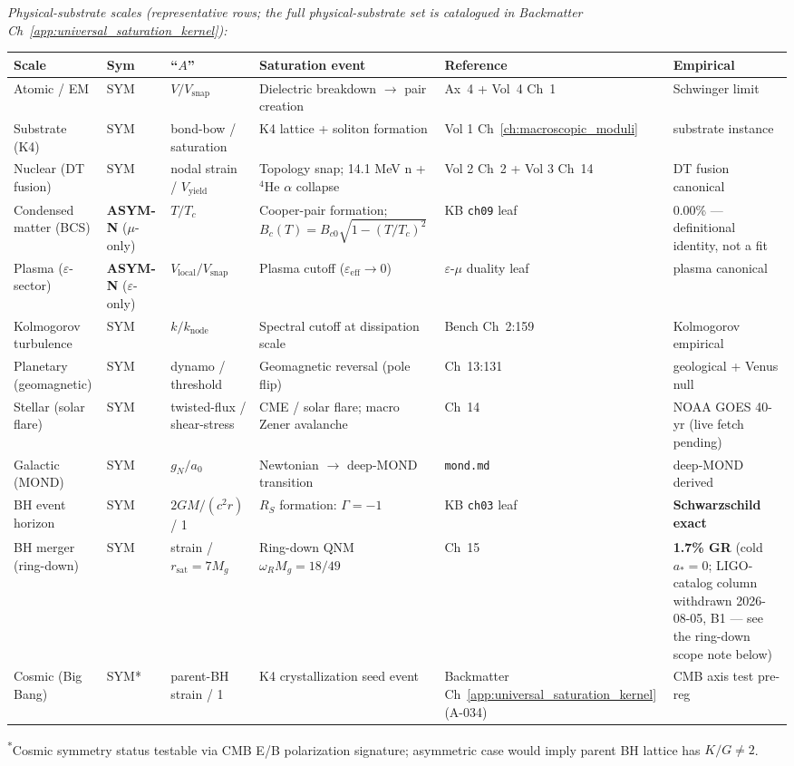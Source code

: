 \textit{Physical-substrate scales (representative rows; the full physical-substrate set is catalogued in Backmatter Ch~\ref{app:universal_saturation_kernel}):}
\begin{center}
\scriptsize
\begin{tabular}{|p{1.8cm}|p{1.0cm}|p{2.2cm}|p{2.7cm}|p{2.1cm}|p{2.0cm}|}
\hline
\textbf{Scale} & \textbf{Sym} & \textbf{``$A$''} & \textbf{Saturation event} & \textbf{Reference} & \textbf{Empirical} \\
\hline
Atomic / EM & SYM & $V/V_{\text{snap}}$ & Dielectric breakdown $\to$ pair creation & Ax~4 + Vol~4 Ch~1 & Schwinger limit \\
\hline
Substrate (K4) & SYM & bond-bow / saturation & K4 lattice + soliton formation & Vol 1 Ch~\ref{ch:macroscopic_moduli} & substrate instance \\
\hline
Nuclear (DT fusion) & SYM & nodal strain / $V_{\text{yield}}$ & Topology snap; 14.1 MeV n + $^4$He $\alpha$ collapse & Vol 2 Ch~2 + Vol 3 Ch~14 & DT fusion canonical \\
\hline
Condensed matter (BCS) & \textbf{ASYM-N} ($\mu$-only) & $T/T_c$ & Cooper-pair formation; $B_c(T) = B_{c0}\sqrt{1-(T/T_c)^2}$ & KB \texttt{ch09} leaf & 0.00\% --- definitional identity, not a fit \\
\hline
Plasma ($\varepsilon$-sector) & \textbf{ASYM-N} ($\varepsilon$-only) & $V_{\text{local}} / V_{\text{snap}}$ & Plasma cutoff ($\varepsilon_{\text{eff}} \to 0$) & $\varepsilon$-$\mu$ duality leaf & plasma canonical \\
\hline
Kolmogorov turbulence & SYM & $k/k_{\text{node}}$ & Spectral cutoff at dissipation scale & Bench Ch~2:159 & Kolmogorov empirical \\
\hline
Planetary (geomagnetic) & SYM & dynamo / threshold & Geomagnetic reversal (pole flip) & Ch~13:131 & geological + Venus null \\
\hline
Stellar (solar flare) & SYM & twisted-flux / shear-stress & CME / solar flare; macro Zener avalanche & Ch~14 & NOAA GOES 40-yr (live fetch pending) \\
\hline
Galactic (MOND) & SYM & $g_N/a_0$ & Newtonian $\to$ deep-MOND transition & \texttt{mond.md} & deep-MOND derived \\
\hline
BH event horizon & SYM & $2GM/(c^2 r)$ / 1 & $R_S$ formation: $\Gamma=-1$\gammaundeclared{} & KB \texttt{ch03} leaf & \textbf{Schwarzschild exact} \\
\hline
BH merger (ring-down) & SYM & strain / $r_{\text{sat}}=7M_g$ & Ring-down QNM $\omega_R M_g = 18/49$ & Ch~15 & \textbf{1.7\% GR} (cold $a_*=0$; LIGO-catalog column withdrawn 2026-08-05, B1 --- see the ring-down scope note below) \\
\hline
Cosmic (Big Bang) & SYM* & parent-BH strain / 1 & K4 crystallization seed event & Backmatter Ch~\ref{app:universal_saturation_kernel} (A-034) & CMB axis test pre-reg \\
\hline
\end{tabular}
\end{center}
\textsuperscript{*}Cosmic symmetry status testable via CMB E/B polarization
signature; asymmetric case would imply parent BH lattice has $K/G \neq 2$.

